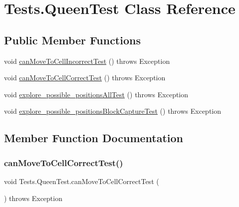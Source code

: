 \hypertarget{class_tests_1_1_queen_test}{}\section{Tests.\+Queen\+Test Class Reference}
\label{class_tests_1_1_queen_test}
\subsection*{Public Member Functions}
\begin{DoxyCompactItemize}
\item 
void \hyperlink{class_tests_1_1_queen_test_a23ace3b7817d95fa5e64b4a9899a5364}{can\+Move\+To\+Cell\+Incorrect\+Test} ()  throws Exception 
\item 
void \hyperlink{class_tests_1_1_queen_test_a0b52ed7e9f5c35e03c62da59a21748b1}{can\+Move\+To\+Cell\+Correct\+Test} ()  throws Exception 
\item 
void \hyperlink{class_tests_1_1_queen_test_ade9b04c6ac46fcab572c5305f71b0044}{explore\+\_\+possible\+\_\+positions\+All\+Test} ()  throws Exception 
\item 
void \hyperlink{class_tests_1_1_queen_test_afd193877a3973ecee5bedb4df0b9a8ef}{explore\+\_\+possible\+\_\+positions\+Block\+Capture\+Test} ()  throws Exception 
\end{DoxyCompactItemize}


\subsection{Member Function Documentation}
\mbox{\label{class_tests_1_1_queen_test_a0b52ed7e9f5c35e03c62da59a21748b1}} 
\subsubsection{\texorpdfstring{can\+Move\+To\+Cell\+Correct\+Test()}{canMoveToCellCorrectTest()}}
{\footnotesize\ttfamily void Tests.\+Queen\+Test.\+can\+Move\+To\+Cell\+Correct\+Test (\begin{DoxyParamCaption}{ }\end{DoxyParamCaption}) throws Exception\hspace{0.3cm}{\ttfamily [inline]}}

